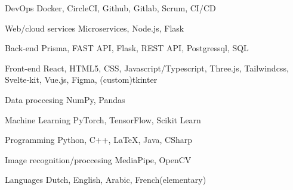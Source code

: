 

\begin{cvskills}

  \cvskill
    {DevOps} %
    {Docker, CircleCI, Github, Gitlab, Scrum, CI/CD} %

\cvskill
    {Web/cloud services} %
    {Microservices, Node.js, Flask} %


  \cvskill
    {Back-end} %
    {Prisma, FAST API, Flask, REST API, Postgressql, SQL} %

  \cvskill
    {Front-end} %
    {React, HTML5, CSS, Javascript/Typescript, Three.js, Tailwindcss, Svelte‑kit, Vue.js, Figma, (custom)tkinter} %

  \cvskill
    {Data proccesing} %
    {NumPy, Pandas} %

  \cvskill
    {Machine Learning} %
    {PyTorch, TensorFlow, Scikit Learn} %

  \cvskill
    {Programming} %
    {Python, C++, LaTeX, Java, CSharp} %

\cvskill
    {Image recognition/proccesing} %
    {MediaPipe, OpenCV} %

\cvskill
    {Languages} %
    {Dutch, English, Arabic, French(elementary)} %

\end{cvskills}
